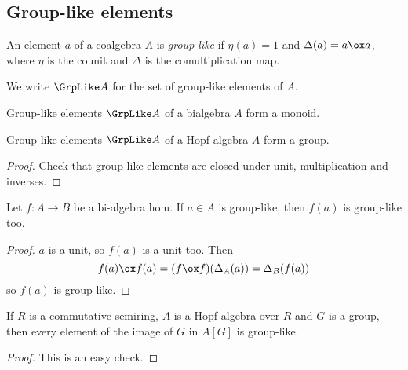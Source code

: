 \subsection{Group-like elements}


\begin{definition}
  \label{0-grp-like}
  \uses{}
  \leanok

  An element $a$ of a coalgebra $A$ is \emph{group-like} if $\eta(a) = 1$ and $\Delta(a) = a \ox a$,
  where $\eta$ is the counit and $\Delta$ is the comultiplication map.

  We write $\GrpLike A$ for the set of group-like elements of $A$.
\end{definition}


\begin{proposition}
  \label{0-grp-like-grp}
  \leanok

  Group-like elements $\GrpLike A$ of a bialgebra $A$ form a monoid.

  Group-like elements $\GrpLike A$ of a Hopf algebra $A$ form a group.
\end{proposition}
\begin{proof}
  \uses{}
  \leanok

  Check that group-like elements are closed under unit, multiplication and inverses.
\end{proof}


\begin{lemma}
  \label{0-grp-like-map}
  \leanok

  Let $f : A \to B$ be a bi-algebra hom. If $a \in A$ is group-like, then $f(a)$ is group-like too.
\end{lemma}
\begin{proof}
  \uses{}
  \leanok

  $a$ is a unit, so $f(a)$ is a unit too. Then
  \[
    f(a) \ox f(a) = (f \ox f)(\Delta_A(a)) = \Delta_B(f(a))
  \]
  so $f(a)$ is group-like.
\end{proof}


\begin{lemma}
  \label{0-grp-like-grp-alg-of}
  \leanok

  If $R$ is a commutative semiring, $A$ is a Hopf algebra over $R$ and
  $G$ is a group, then every element of the image of $G$ in $A[G]$ is group-like.
\end{lemma}
\begin{proof}
  \uses{}
  \leanok

  This is an easy check.
\end{proof}


